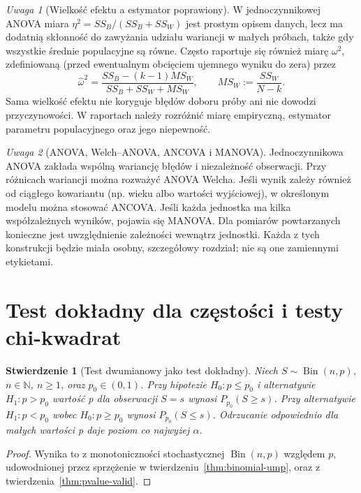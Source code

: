 \documentclass[11pt,a4paper,oneside]{report}
\numberwithin{equation}{chapter}
\theoremstyle{plain}
\newtheorem{stwierdzenie}[twierdzenie]{Stwierdzenie}
\theoremstyle{definition}
\theoremstyle{remark}
\newtheorem{uwaga}{Uwaga}[chapter]
\newcommand{\N}{\mathbb N}
\DeclareMathOperator{\Bin}{Bin}
\begin{document}
\begin{uwaga}[Wielkość efektu a estymator poprawiony]
W jednoczynnikowej ANOVA miara $\eta^2=SS_B/(SS_B+SS_W)$
jest prostym opisem danych, lecz ma dodatnią skłonność do
zawyżania udziału wariancji w małych próbach, także gdy
wszystkie średnie populacyjne są równe. Często raportuje się
również miarę $\omega^2$, zdefiniowaną (przed ewentualnym
obcięciem ujemnego wyniku do zera) przez
\[
 \widehat{\omega}^2=
 \frac{SS_B-(k-1)MS_W}{SS_B+SS_W+MS_W},\qquad
 MS_W:=\frac{SS_W}{N-k}.
\]
Sama wielkość efektu nie koryguje błędów doboru próby ani
nie dowodzi przyczynowości. W raportach należy rozróżnić
miarę empiryczną, estymator parametru populacyjnego oraz
jego niepewność.
\end{uwaga}

\begin{uwaga}[ANOVA, Welch--ANOVA, ANCOVA i MANOVA]
Jednoczynnikowa ANOVA zakłada wspólną wariancję błędów i
niezależność obserwacji. Przy różnicach wariancji można rozważyć
ANOVA Welcha. Jeśli wynik zależy również od ciągłego
kowariantu (np. wieku albo wartości wyjściowej), w określonym
modelu można stosować ANCOVA. Jeśli każda jednostka ma kilka
współzależnych wyników, pojawia się MANOVA. Dla pomiarów
powtarzanych konieczne jest uwzględnienie zależności
wewnątrz jednostki. Każda z tych konstrukcji będzie miała
osobny, szczegółowy rozdział; nie są one zamiennymi etykietami.
\end{uwaga}

\section{Test dokładny dla częstości i testy chi-kwadrat}
\begin{stwierdzenie}[Test dwumianowy jako test dokładny]
Niech $S\sim\Bin(n,p)$, $n\in\N$, $n\ge1$, oraz
$p_0\in(0,1)$. Przy hipotezie $H_0:p\le p_0$ i
alternatywie $H_1:p>p_0$ wartość p dla obserwacji $S=s$
wynosi $P_{p_0}(S\ge s)$. Przy alternatywie
$H_1:p<p_0$ wobec $H_0:p\ge p_0$ wynosi
$P_{p_0}(S\le s)$. Odrzucanie odpowiednio dla małych
wartości p daje poziom co najwyżej $\alpha$.
\end{stwierdzenie}
\begin{proof}
Wynika to z monotoniczności stochastycznej
$\Bin(n,p)$ względem $p$, udowodnionej przez
sprzężenie w twierdzeniu~\ref{thm:binomial-ump}, oraz
z twierdzenia~\ref{thm:pvalue-valid}.
\end{proof}
\end{document}
